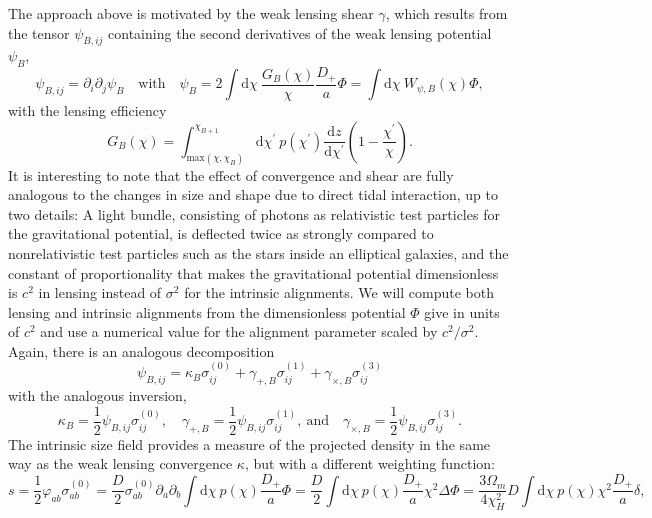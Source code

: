 \documentclass[a4paper,fleqn,usenatbib]{mnras}
\newcommand{\dd}{\mathrm{d}}
\begin{document}
The approach above is motivated by the weak lensing shear $\gamma$, which results from the tensor $\psi_{B,ij}$ containing the second derivatives of the weak lensing potential $\psi_B$,
\begin{equation}
\psi_{B,ij} = \partial_i\partial_j\psi_B
\quad\mathrm{with}\quad
\psi_B = 2\int\dd\chi\:\frac{G_B(\chi)}{\chi}\frac{D_+}{a}\Phi = \int\dd\chi\:W_{\psi,B}(\chi)\Phi,
\end{equation}
with the lensing efficiency
\begin{equation}
G_B(\chi) = \int_{\mathrm{max}(\chi,\chi_B)}^{\chi_{B+1}}\dd\chi^\prime\:p(\chi^\prime)\frac{\dd z}{\dd\chi^\prime}\left(1-\frac{\chi^\prime}{\chi}\right).
\end{equation}
It is interesting to note that the effect of convergence and shear are fully analogous to the changes in size and shape due to direct tidal interaction, up to two details: A light bundle, consisting of photons as relativistic test particles for the gravitational potential, is deflected twice as strongly compared to nonrelativistic test particles such as the stars inside an elliptical galaxies, and the constant of proportionality that makes the gravitational potential dimensionless is $c^2$ in lensing instead of $\sigma^2$ for the intrinsic alignments. We will compute both lensing and intrinsic alignments from the dimensionless potential $\Phi$ give in units of $c^2$ and use a numerical value for the alignment parameter scaled by $c^2/\sigma^2$. Again, there is an analogous decomposition
\begin{equation}
\psi_{B,ij} = \kappa_B\sigma^{(0)}_{ij} + \gamma_{+,B}\sigma^{(1)}_{ij} +\gamma_{\times,B}\sigma^{(3)}_{ij}
\end{equation}
with the analogous inversion,
\begin{equation}
\kappa_B = \frac{1}{2}\psi_{B,ij}\sigma^{(0)}_{ij},
\quad
\gamma_{+,B} = \frac{1}{2}\psi_{B,ij}\sigma^{(1)}_{ij},
\mathrm{~and}\quad
\gamma_{\times,B} = \frac{1}{2}\psi_{B,ij}\sigma^{(3)}_{ij}.
\end{equation}
The intrinsic size field provides a measure of the projected density in the same way as the weak lensing convergence $\kappa$, but with a different weighting function:
\begin{equation}
s = 
\frac{1}{2}\varphi_{ab}\sigma^{(0)}_{ab} = 
\frac{D}{2}\sigma^{(0)}_{ab}\partial_a\partial_b\int\dd\chi\: p(\chi)\frac{D_+}{a}\Phi = 
\frac{D}{2}\int\dd\chi\:p(\chi)\frac{D_+}{a}\chi^2\Delta\Phi = 
\frac{3\Omega_m}{4\chi_H^2}D\int\dd\chi\:p(\chi)\chi^2 \frac{D_+}{a}\delta,
\end{equation}
\end{document}
